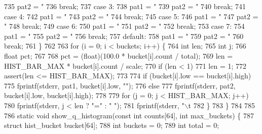 \begin{DoxyCodeInclude}
{{{{{{{{{{{{735       pat2 = \textcolor{stringliteral}{"%
736       \textcolor{keywordflow}{break};
737     \textcolor{keywordflow}{case} 3:
738       pat1 = \textcolor{stringliteral}{"%
739       pat2 = \textcolor{stringliteral}{"%
740       \textcolor{keywordflow}{break};
741     \textcolor{keywordflow}{case} 4:
742       pat1 = \textcolor{stringliteral}{"%
743       pat2 = \textcolor{stringliteral}{"%
744       \textcolor{keywordflow}{break};
745     \textcolor{keywordflow}{case} 5:
746       pat1 = \textcolor{stringliteral}{"%
747       pat2 = \textcolor{stringliteral}{"%
748       \textcolor{keywordflow}{break};
749     \textcolor{keywordflow}{case} 6:
750       pat1 = \textcolor{stringliteral}{"%
751       pat2 = \textcolor{stringliteral}{"%
752       \textcolor{keywordflow}{break};
753     \textcolor{keywordflow}{case} 7:
754       pat1 = \textcolor{stringliteral}{"%
755       pat2 = \textcolor{stringliteral}{"%
756       \textcolor{keywordflow}{break};
757     \textcolor{keywordflow}{default}:
758       pat1 = \textcolor{stringliteral}{"%
759       pat2 = \textcolor{stringliteral}{"%
760       \textcolor{keywordflow}{break};
761   \}
762 
763   \textcolor{keywordflow}{for} (i = 0; i < buckets; i++) \{
764     \textcolor{keywordtype}{int} len;
765     \textcolor{keywordtype}{int} j;
766     \textcolor{keywordtype}{float} pct;
767 
768     pct = (float)(100.0 * bucket[i].count / total);
769     len = HIST\_BAR\_MAX * bucket[i].count / scale;
770     \textcolor{keywordflow}{if} (len < 1)
771       len = 1;
772     assert(len <= HIST\_BAR\_MAX);
773 
774     \textcolor{keywordflow}{if} (bucket[i].low == bucket[i].high)
775       fprintf(stderr, pat1, bucket[i].low, \textcolor{stringliteral}{""});
776     \textcolor{keywordflow}{else}
777       fprintf(stderr, pat2, bucket[i].low, bucket[i].high);
778 
779     \textcolor{keywordflow}{for} (j = 0; j < HIST\_BAR\_MAX; j++)
780       fprintf(stderr, j < len ? \textcolor{stringliteral}{"="} : \textcolor{stringliteral}{" "});
781     fprintf(stderr, \textcolor{stringliteral}{"\(\backslash\)t%
782   \}
783 \}
784 
785 
786 \textcolor{keyword}{static} \textcolor{keywordtype}{void} show\_q\_histogram(\textcolor{keyword}{const} \textcolor{keywordtype}{int} counts[64], \textcolor{keywordtype}{int} max\_buckets) \{
787   \textcolor{keyword}{struct }hist\_bucket bucket[64];
788   \textcolor{keywordtype}{int} buckets = 0;
789   \textcolor{keywordtype}{int} total = 0;
}}}}}}}}}}}}}}}}}}}}}}}}}}
\end{DoxyCodeInclude}
